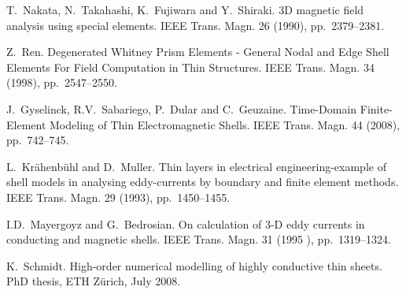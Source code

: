 
\begin{thebibliography}{10}
{\sc T.~Nakata, N.~Takahashi, K.~Fujiwara and Y.~Shiraki}. {3D magnetic field analysis using special elements}. IEEE Trans. Magn. 26   (1990), pp.~2379--2381.

{\sc Z.~Ren}. {Degenerated Whitney Prism Elements - General Nodal and Edge Shell Elements
For Field Computation in Thin Structures}. IEEE Trans. Magn. 34 (1998), pp.~2547--2550.

{\sc J.~Gyselinck, R.V.~Sabariego, P.~Dular and C.~Geuzaine}. {Time-Domain Finite-Element Modeling of Thin Electromagnetic Shells}. IEEE Trans. Magn. 44 (2008), pp.~742--745.

{\sc L.~Kr\"ahenb\"uhl and D.~Muller}. {Thin layers in electrical engineering-example of shell models in analysing eddy-currents by boundary and finite element methods}. IEEE Trans. Magn. 29 (1993), pp.~1450--1455.

{\sc I.D.~Mayergoyz and G.~Bedrosian}. {On calculation of 3-D eddy currents in conducting and magnetic shells}. IEEE Trans. Magn. 31  (1995 ), pp.~1319--1324.

{\sc K.~Schmidt}. {High-order numerical modelling of highly conductive thin sheets}. PhD thesis, ETH Z\"urich, July 2008.
\end{thebibliography}